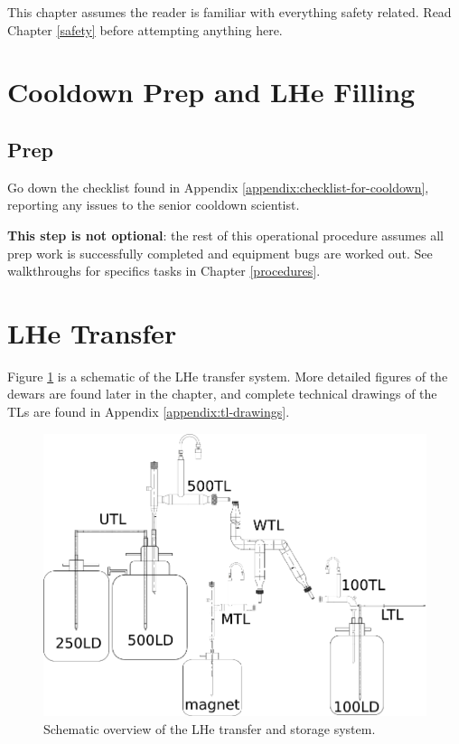 This chapter assumes the reader is familiar with everything safety related.  Read Chapter \ref{safety} before attempting anything here.



\section{Cooldown Prep and LHe Filling}
\subsection{Prep}
\label{practical-op:prep}
Go down the checklist found in Appendix \ref{appendix:checklist-for-cooldown}, reporting any issues to the senior cooldown scientist.

\textbf{This step is not optional}: the rest of this operational procedure assumes all prep work is successfully completed and equipment bugs are worked out.  See walkthroughs for specifics tasks in Chapter \ref{procedures}.

\section{LHe Transfer}

Figure \ref{fig:cryo-schematic-all} is a schematic of the LHe transfer system.  More detailed figures of the dewars are found later in the chapter, and complete technical drawings of the TLs are found in Appendix \ref{appendix:tl-drawings}.

\begin{figure}[htbp!]
 \centering
 \includegraphics[width=\textwidth]{./img/cryo-schematic-all.png}
 \caption{Schematic overview of the LHe transfer and storage system.}
 \label{fig:cryo-schematic-all}
\end{figure}

